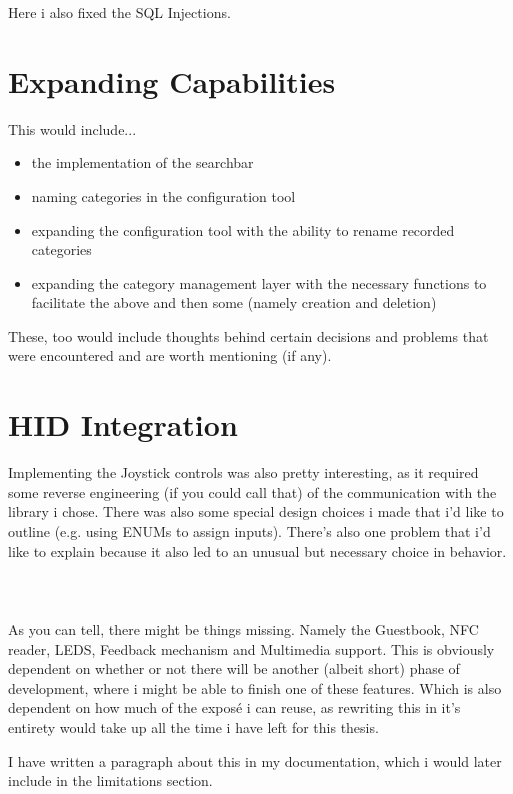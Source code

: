 Here i also fixed the SQL Injections.

\section{Expanding Capabilities}

This would include...

\begin{itemize}
	\item the implementation of the searchbar
	\item naming categories in the configuration tool
	\item expanding the configuration tool with the ability to rename recorded categories
	\item expanding the category management layer with the necessary functions to facilitate the above and then some (namely creation and deletion)
\end{itemize}

These, too would include thoughts behind certain decisions and problems that were encountered and are worth mentioning (if any).

\section{HID Integration}

Implementing the Joystick controls was also pretty interesting, as it required some reverse engineering (if you could call that) of the communication with the library i chose.
There was also some special design choices i made that i'd like to outline (e.g. using ENUMs to assign inputs).
There's also one problem that i'd like to explain because it also led to an unusual but necessary choice in behavior.\\\\\\\\


As you can tell, there might be things missing. Namely the Guestbook, NFC reader, LEDS, Feedback mechanism and Multimedia support.
This is obviously dependent on whether or not there will be another (albeit short) phase of development, where i might be able to finish one of these features. Which is also dependent on how much of the exposé i can reuse, as rewriting this in it's entirety would take up all the time i have left for this thesis.

I have written a paragraph about this in my documentation, which i would later include in the limitations section.
